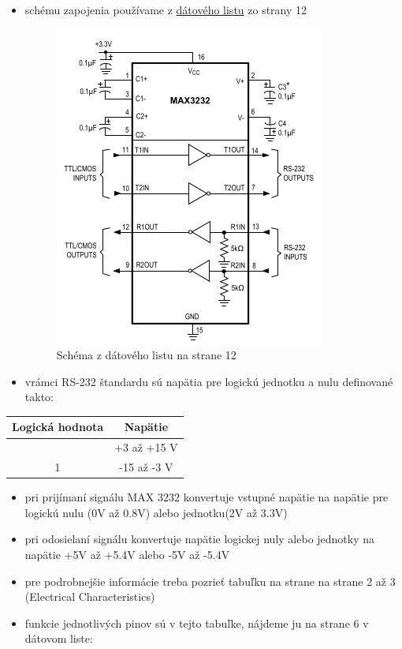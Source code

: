\documentclass[12pt, twoside]{book}
\begin{document}
\begin{itemize}
  \begin{itemize}
  \item
    schému zapojenia používame z \href{https://github.com/ostertag/UACS/blob/hardwear_kozuch/rs-232_interface/Data_sheet.pdf}{dátového listu}
    zo strany 12
    \begin{figure}[!h]
        \centering
        \includegraphics[width=0.5\linewidth]{org_sch.png}
        \caption{Schéma z dátového listu na strane 12}
        \label{fig:enter-label}
    \end{figure}
  \item
    vrámci RS-232 štandardu sú napätia pre logickú jednotku a nulu
    definované takto:
  \end{itemize}

  \begin{longtable}[]{@{}cc@{}}
  \toprule\noalign{}
  Logická hodnota & Napätie \\
  \midrule\noalign{}
  \endhead
  \bottomrule\noalign{}
  \endlastfoot
  0 & +3 až +15 V \\
  1 & -15 až -3 V \\
  \end{longtable}

  \begin{itemize}
  
  \item
    pri prijímaní signálu MAX 3232 konvertuje vstupné napätie na napätie
    pre logickú nulu (0V až 0.8V) alebo jednotku(2V až 3.3V)
  \item
    pri odosielaní signálu konvertuje napätie logickej nuly alebo
    jednotky na napätie +5V až +5.4V alebo -5V až -5.4V 
  \item
    pre podrobnejšie informácie treba pozrieť tabuľku na strane na strane 2 až 3 (Electrical Characteristics)
  \item
    funkcie jednotlivých pinov sú v tejto tabuľke, nájdeme ju na strane
    6 v dátovom liste:
  \end{itemize}


\end{itemize}
\end{document}
